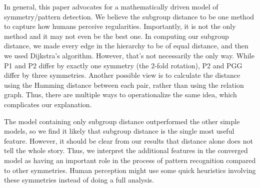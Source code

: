 In general, this paper advocates for a mathematically driven model of symmetry/pattern detection. We believe the subgroup distance to be one method to capture how humans perceive regularities. Importantly, it is not the only method and it may not even be the best one. In computing our subgroup distance, we made every edge in the hierarchy to be of equal distance, and then we used Dijkstra's algorithm. However, that's not necessarily the only way. While P1 and P2 differ by exactly one symmetry (the 2-fold rotation), P2 and PGG differ by three symmetries. Another possible view is to calculate the distance using the Hamming distance between each pair, rather than using the relation graph. Thus, there are multiple ways to operationalize the same idea, which complicates our explanation.

The model containing only subgroup distance outperformed the other simple models, so we find it likely that subgroup distance is the single most useful feature. However, it should be clear from our results that distance alone does not tell the whole story. Thus, we interpret the additional features in the converged model as having an important role in the process of pattern recognition compared to other symmetries. Human perception might use some quick heuristics involving these symmetries instead of doing a full analysis. 


